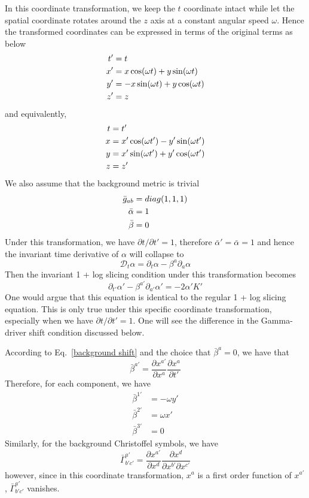 \documentclass[letterpaper,nofootinbib,prd,amsmath,onecolumn]{revtex4-1}
\begin{document}
In this coordinate transformation, we keep the $t$ coordinate intact while let the spatial coordinate rotates around the $z$ axis at a constant angular speed $\omega$. Hence the transformed coordinates can be expressed in terms of the original terms as below
\begin{align}
t' & = t\notag\\
x' & = x \cos(\omega t) + y\sin(\omega t)\notag\\
y' & = -x\sin(\omega t) + y\cos(\omega t)\notag\\
z' & = z
\end{align}
and equivalently, 
\begin{align}
t & = t'\notag\\
x & = x'\cos(\omega t') - y'\sin(\omega t')\notag\\
y & = x'\sin(\omega t') + y'\cos(\omega t')\notag\\
z & = z'
\end{align}
We also assume that the background metric is trivial
\begin{align}
{\bar g}_{ab} & = diag(1,1,1)\notag\\
{\bar \alpha} & = 1\notag\\
{\bar \beta} & = 0 
\end{align}
Under this transformation, we have $\partial t/\partial t' = 1$, therefore ${\bar \alpha}' = {\bar \alpha} = 1$ and hence the invariant time derivative of $\alpha$ will collapse to
\begin{equation}
\mathscr{D}_{t}\alpha = \partial_{t}\alpha - \beta^{a}\partial_{a}\alpha
\end{equation}
Then the invariant 1 + log slicing condition under this transformation becomes
\begin{equation}\label{transformed 1 + log slicing}
\partial_{t'}\alpha' - \beta^{a'}\partial_{a'}\alpha' = -2\alpha'K'
\end{equation}
One would argue that this equation is identical to the regular 1 + log slicing equation. This is only true under this specific coordinate transformation, especially when we have $\partial t/\partial t' = 1$. One will see the difference in the Gamma-driver shift condition discussed below. 

According to Eq.~\ref{background shift} and the choice that ${\bar \beta}^{a} = 0$, we have that
\[
{\bar \beta}^{a'} = \frac{\partial x^{a'}}{\partial x^{a}}\frac{\partial x^{a}}{\partial t'}
\]
Therefore, for each component, we have
\begin{align*}
{\bar \beta}^{1'} & = -\omega y'\\
{\bar \beta}^{2'} & = \omega x'\\
{\bar \beta}^{3'} & = 0
\end{align*}
Similarly, for the background Christoffel symbols, we have
\[
{\bar \Gamma}^{a'}_{b'c'} = \frac{\partial x^{a'}}{\partial x^{d}}\frac{\partial x^{d}}{\partial x^{b'}\partial x^{c'}}
\]
however, since in this coordinate transformation, $x^{a}$ is a first order function of $x^{a'}$, ${\bar \Gamma}^{a'}_{b'c'}$ vanishes. 
\end{document}
